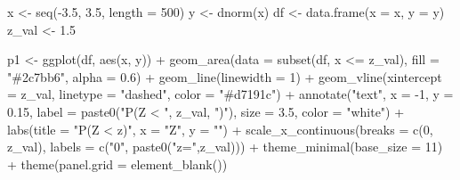 \documentclass[
  12pt,
  letterpaper,
]{book}
\newenvironment{Shaded}{\begin{snugshade}}{\end{snugshade}}
\newcommand{\AttributeTok}[1]{\textcolor[rgb]{0.40,0.45,0.13}{#1}}
\newcommand{\DecValTok}[1]{\textcolor[rgb]{0.68,0.00,0.00}{#1}}
\newcommand{\FloatTok}[1]{\textcolor[rgb]{0.68,0.00,0.00}{#1}}
\newcommand{\FunctionTok}[1]{\textcolor[rgb]{0.28,0.35,0.67}{#1}}
\newcommand{\NormalTok}[1]{\textcolor[rgb]{0.00,0.23,0.31}{#1}}
\newcommand{\OtherTok}[1]{\textcolor[rgb]{0.00,0.23,0.31}{#1}}
\newcommand{\SpecialCharTok}[1]{\textcolor[rgb]{0.37,0.37,0.37}{#1}}
\newcommand{\StringTok}[1]{\textcolor[rgb]{0.13,0.47,0.30}{#1}}
\begin{document}
\begin{Shaded}
\begin{Highlighting}[]
\NormalTok{x }\OtherTok{\textless{}{-}} \FunctionTok{seq}\NormalTok{(}\SpecialCharTok{{-}}\FloatTok{3.5}\NormalTok{, }\FloatTok{3.5}\NormalTok{, }\AttributeTok{length =} \DecValTok{500}\NormalTok{)}
\NormalTok{y }\OtherTok{\textless{}{-}} \FunctionTok{dnorm}\NormalTok{(x)}
\NormalTok{df }\OtherTok{\textless{}{-}} \FunctionTok{data.frame}\NormalTok{(}\AttributeTok{x =}\NormalTok{ x, }\AttributeTok{y =}\NormalTok{ y)}
\NormalTok{z\_val }\OtherTok{\textless{}{-}} \FloatTok{1.5}

\NormalTok{p1 }\OtherTok{\textless{}{-}} \FunctionTok{ggplot}\NormalTok{(df, }\FunctionTok{aes}\NormalTok{(x, y)) }\SpecialCharTok{+}
  \FunctionTok{geom\_area}\NormalTok{(}\AttributeTok{data =} \FunctionTok{subset}\NormalTok{(df, x }\SpecialCharTok{\textless{}=}\NormalTok{ z\_val), }\AttributeTok{fill =} \StringTok{"\#2c7bb6"}\NormalTok{, }\AttributeTok{alpha =} \FloatTok{0.6}\NormalTok{) }\SpecialCharTok{+}
  \FunctionTok{geom\_line}\NormalTok{(}\AttributeTok{linewidth =} \DecValTok{1}\NormalTok{) }\SpecialCharTok{+}
  \FunctionTok{geom\_vline}\NormalTok{(}\AttributeTok{xintercept =}\NormalTok{ z\_val, }\AttributeTok{linetype =} \StringTok{"dashed"}\NormalTok{, }\AttributeTok{color =} \StringTok{"\#d7191c"}\NormalTok{) }\SpecialCharTok{+}
  \FunctionTok{annotate}\NormalTok{(}\StringTok{"text"}\NormalTok{, }\AttributeTok{x =} \SpecialCharTok{{-}}\DecValTok{1}\NormalTok{, }\AttributeTok{y =} \FloatTok{0.15}\NormalTok{,}
           \AttributeTok{label =} \FunctionTok{paste0}\NormalTok{(}\StringTok{"P(Z \textless{} "}\NormalTok{, z\_val, }\StringTok{")"}\NormalTok{), }\AttributeTok{size =} \FloatTok{3.5}\NormalTok{, }\AttributeTok{color =} \StringTok{"white"}\NormalTok{) }\SpecialCharTok{+}
  \FunctionTok{labs}\NormalTok{(}\AttributeTok{title =} \StringTok{"P(Z \textless{} z)"}\NormalTok{, }\AttributeTok{x =} \StringTok{"Z"}\NormalTok{, }\AttributeTok{y =} \StringTok{""}\NormalTok{) }\SpecialCharTok{+}
  \FunctionTok{scale\_x\_continuous}\NormalTok{(}\AttributeTok{breaks =} \FunctionTok{c}\NormalTok{(}\DecValTok{0}\NormalTok{, z\_val),}
                     \AttributeTok{labels =} \FunctionTok{c}\NormalTok{(}\StringTok{"0"}\NormalTok{, }\FunctionTok{paste0}\NormalTok{(}\StringTok{"z="}\NormalTok{,z\_val))) }\SpecialCharTok{+}
  \FunctionTok{theme\_minimal}\NormalTok{(}\AttributeTok{base\_size =} \DecValTok{11}\NormalTok{) }\SpecialCharTok{+}
  \FunctionTok{theme}\NormalTok{(}\AttributeTok{panel.grid =} \FunctionTok{element\_blank}\NormalTok{())}


\end{Highlighting}
\end{Shaded}
\end{document}
